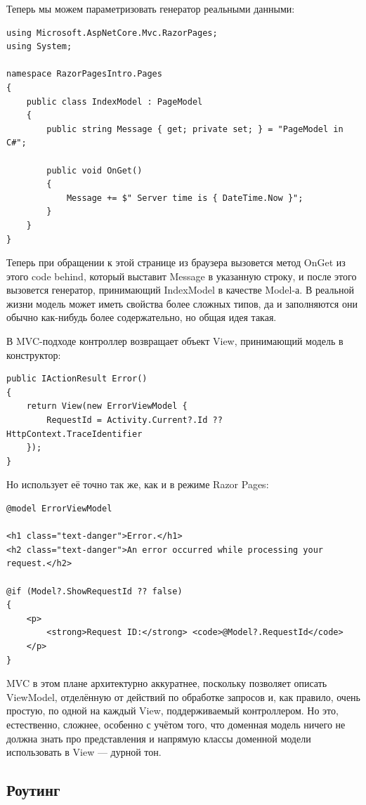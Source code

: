 \documentclass[a5paper]{article}
\begin{document}
Теперь мы можем параметризовать генератор реальными данными:

\begin{verbatim}
using Microsoft.AspNetCore.Mvc.RazorPages;
using System;

namespace RazorPagesIntro.Pages
{
    public class IndexModel : PageModel
    {
        public string Message { get; private set; } = "PageModel in C#";

        public void OnGet()
        {
            Message += $" Server time is { DateTime.Now }";
        }
    }
}
\end{verbatim}

Теперь при обращении к этой странице из браузера вызовется метод OnGet из этого code behind, который выставит Message в указанную строку, и после этого вызовется генератор, принимающий IndexModel в качестве Model-а. В реальной жизни модель может иметь свойства более сложных типов, да и заполняются они обычно как-нибудь более содержательно, но общая идея такая. 

В MVC-подходе контроллер возвращает объект View, принимающий модель в конструктор:

\begin{verbatim}
public IActionResult Error()
{
    return View(new ErrorViewModel { 
        RequestId = Activity.Current?.Id ?? HttpContext.TraceIdentifier 
    });
}
\end{verbatim}

Но использует её точно так же, как и в режиме Razor Pages:

\begin{verbatim}
@model ErrorViewModel

<h1 class="text-danger">Error.</h1>
<h2 class="text-danger">An error occurred while processing your request.</h2>

@if (Model?.ShowRequestId ?? false)
{
    <p>
        <strong>Request ID:</strong> <code>@Model?.RequestId</code>
    </p>
}
\end{verbatim}

MVC в этом плане архитектурно аккуратнее, поскольку позволяет описать ViewModel, отделённую от действий по обработке запросов и, как правило, очень простую, по одной на каждый View, поддерживаемый контроллером. Но это, естественно, сложнее, особенно с учётом того, что доменная модель ничего не должна знать про представления и напрямую классы доменной модели использовать в View --- дурной тон.

\subsection{Роутинг}
\end{document}
